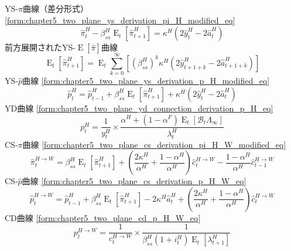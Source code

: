 YS-\(\pi\)曲線（差分形式）
\eqref{form:chapter5_two_plane_ys_derivation_pi_H_modified_eq}
\begin{equation}
\label{form:chapter5_a_shock_policies_overview_ys_pi_eq}
    \hat{\pi}_t^H-\beta_{ss}^H\operatorname{E}_t[\hat{\pi}_{t+1}^H]=\kappa^H(2\hat{y}_t^H-2\hat{a}_t^H)
\end{equation}
前方展開されたYS-\(\operatorname{E}[\hat{\pi}]\)曲線
\begin{equation}
\label{form:chapter5_a_shock_policies_overview_ys_E_pi_H_lim_eq}
    \operatorname{E}_t[\hat{\pi}_{t+1}^H]=\operatorname{E}_t\sum_{k=0}^{\infty}\left[(\beta_{ss}^H)^k\kappa^H(2\hat{y}_{t+1+k}^H-2\hat{a}_{t+1+k}^H)\right]
\end{equation}
YS-\(\hat{p}\)曲線
\eqref{form:chapter5_two_plane_ys_derivation_p_H_modified_eq}
\begin{equation}
\label{form:chapter5_a_shock_policies_overview_ys_p_eq}
    \hat{p}_t^H=\hat{p}_{t-1}^H+\beta_{ss}^H\operatorname{E}_t[\hat{\pi}_{t+1}^H]+\kappa^H(2\hat{y}_t^H-2\hat{a}_t^H)
\end{equation}
YD曲線
\eqref{form:chapter5_two_plane_yd_connection_derivation_p_H_eq}
\begin{equation}
\label{form:chapter5_a_shock_policies_overview_yd_eq}
    p_t^H=\frac{1}{y_t^H}\times\frac{\alpha^H+(1-\alpha^F)\operatorname{E}_t[\mathcal{B}_t\Lambda_{\infty}]}{\lambda_t^H}
\end{equation}
CS-\(\pi\)曲線
\eqref{form:chapter5_two_plane_cs_derivation_pi_H_W_modified_eq}
\begin{equation}
\label{form:chapter5_a_shock_policies_overview_cs_pi_eq}
    \hat{\pi}_t^{H\to W}=\beta_{ss}^H\operatorname{E}_t[\hat{\pi}_{t+1}^H]+\left(\frac{2\kappa^H}{\alpha^H}+\frac{1-\alpha^H}{\alpha^H}\right)\hat{c}_t^{H\to W}-\frac{1-\alpha^H}{\alpha^H}\hat{c}_{t-1}^{H\to W}
\end{equation}
CS-\(\hat{p}\)曲線
\eqref{form:chapter5_two_plane_cs_derivation_p_H_W_eq}
\begin{equation}
\label{form:chapter5_a_shock_policies_overview_cs_p_eq}
    \hat{p}_t^{H\to W}=\hat{p}_{t-1}^H+\beta_{ss}^H\operatorname{E}_t[\hat{\pi}_{t+1}^H]-2\kappa^H\hat{a}_t^H+\left(\frac{2\kappa^H}{\alpha^H}+\frac{1-\alpha^H}{\alpha^H}\right)\hat{c}_t^{H\to W}
\end{equation}
CD曲線
\eqref{form:chapter5_two_plane_cd_p_H_W_eq}
\begin{equation}
\label{form:chapter5_a_shock_policies_overview_cd_eq}
    p_t^{H\to W}=\frac{1}{c_t^{H\to W}}\times\frac{1}{\beta_{ss}^H(1+i_t^H)\operatorname{E}_t[\lambda_{t+1}^H]}
\end{equation}

